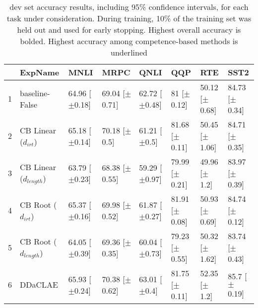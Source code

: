 \begin{table*}[ht]
\centering
\begingroup\small
\begin{tabular}{rlllllll}
  \toprule
 & ExpName & MNLI & MRPC & QNLI & QQP & RTE & SST2 \\ 
  \midrule
1 & baseline-False & 64.96 [$\pm$0.18] & 69.04 [$\pm$0.71] & 62.72 [$\pm$0.48] & 81 [$\pm$0.12] & 50.12 [$\pm$0.68] & 84.73 [$\pm$0.34] \\ 
  2 & CB Linear ($d_{irt}$) & 65.18 [$\pm$0.14] & 70.18 [$\pm$0.5] & 61.21 [$\pm$0.5] & 81.68 [$\pm$0.11] & 50.45 [$\pm$1.06] & 84.71 [$\pm$0.35] \\ 
  3 & CB Linear ($d_{length}$) & 63.79 [$\pm$0.23] & 68.38 [$\pm$0.55] & 59.29 [$\pm$0.97] & 79.99 [$\pm$0.21] & 49.96 [$\pm$1.2] & 83.97 [$\pm$0.39] \\ 
  4 & CB Root ($d_{irt}$) & 65.37 [$\pm$0.16] & 69.98 [$\pm$0.52] & 61.87 [$\pm$0.27] & 81.91 [$\pm$0.08] & 50.93 [$\pm$0.69] & 84.74 [$\pm$0.12] \\ 
  5 & CB Root ($d_{length}$) & 64.05 [$\pm$0.39] & 69.36 [$\pm$0.35] & 60.04 [$\pm$0.73] & 79.23 [$\pm$0.55] & 50.32 [$\pm$1.62] & 83.74 [$\pm$0.43] \\ 
  6 & DDaCLAE & 65.93 [$\pm$0.24] & 70.38 [$\pm$0.62] & 63.01 [$\pm$0.4] & 81.75 [$\pm$0.11] & 52.35 [$\pm$1.2] & 85.7 [$\pm$0.19] \\ 
   \bottomrule
\end{tabular}
\endgroup
\caption{dev set accuracy results, including 95\% confidence intervals, for each task under consideration. During training, 10\% of the training set was held out and used for early stopping. Highest overall accuracy is bolded. Highest accuracy among competence-based methods is underlined} 
\label{tab:acc_lstm-True}
\end{table*}
